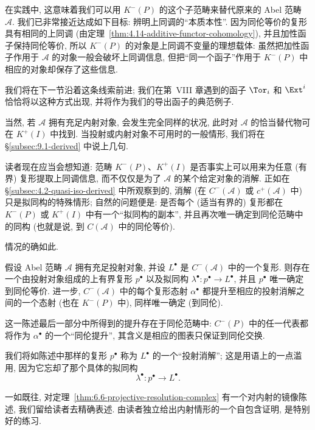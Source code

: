 在实践中, 这意味着我们可以用 $K^{-}(P)$ 的这个子范畴来替代原来的 Abel 范畴 $\mathcal{A}$. 我们已非常接近达成如下目标: 辨明上同调的``本质本性''. 因为同伦等价的复形具有相同的上同调 (由定理~\ref{thm:4.14-additive-functor-cohomology}), 并且加性函子保持同伦等价, 所以 $K^{-}(P)$ 的对象是上同调不变量的理想载体: 虽然把加性函子作用于 $\mathcal{A}$ 的对象一般会破坏上同调信息, 但把``同一个函子''作用于 $K^{-}(P)$ 中相应的对象却保存了这些信息.

我们将在下一节沿着这条线索前进; 我们在第~VIII 章遇到的函子 $\Tor_i$ 和 $\Ext^i$ 恰恰将以这种方式出现, 并将作为我们的导出函子的典范例子.

当然, 若 $\mathcal{A}$ 拥有充足内射对象, 会发生完全同样的状况, 此时对 $\mathcal{A}$ 的恰当替代物可在 $K^{+}(I)$ 中找到. 当投射或内射对象不可用时的一般情形, 我们将在 \S\ref{subsec:9.1-derived} 中说上几句.

读者现在应当会想知道: 范畴 $K^{-}(P)$、$K^{+}(I)$ 是否事实上可以用来为任意 (有界) 复形提取上同调信息, 而不仅仅是为了 $\mathcal{A}$ 的某个给定对象的消解. 正如在 \S\ref{subsec:4.2-quasi-iso-derived} 中所观察到的, 消解 (在 $C^{-}(\mathcal{A})$ 或 $c^{+}(\mathcal{A})$ 中) 只是拟同构的特殊情形; 自然的问题便是: 是否每个 (适当有界的) 复形都在 $K^{-}(P)$ 或 $K^{+}(I)$ 中有一个``拟同构的副本'', 并且再次唯一确定到同伦范畴中的同构 (也就是说, 到 $C(\mathcal{A})$ 中的同伦等价).

情况的确如此.

\begin{theorem}\label{thm:6.6-projective-resolution-complex}
假设 Abel 范畴 $\mathcal{A}$ 拥有充足投射对象, 并设 $L^\bullet$ 是 $C^{-}(\mathcal{A})$ 中的一个复形. 则存在一个由投射对象组成的上有界复形 $p^\bullet$ 以及拟同构 $\lambda^\bullet:p^\bullet\to L^\bullet$, 并且 $p^\bullet$ 唯一确定到同伦等价. 进一步, $C^{-}(\mathcal{A})$ 中的每个复形态射 $\alpha^\bullet$ 都提升至相应的投射消解之间的一个态射 (也在 $K^{-}(P)$ 中), 同样唯一确定 (到同伦).
\end{theorem}

\noindent 这一陈述最后一部分中所得到的提升存在于同伦范畴中: $C^{-}(P)$ 中的任一代表都将作为 $\alpha^\bullet$ 的一个``同伦提升'', 其含义是相应的图表只保证到同伦交换.

我们将如陈述中那样的复形 $p^\bullet$ 称为 $L^\bullet$ 的一个``投射消解''; 这是用语上的一点滥用, 因为它忘却了那个具体的拟同构
\[
\lambda^\bullet:p^\bullet\to L^\bullet.
\]

\noindent 一如既往, 对定理~\ref{thm:6.6-projective-resolution-complex} 有一个对内射的镜像陈述, 我们留给读者去精确表述. 由读者独立给出内射情形的一个自包含证明, 是特别好的练习.


